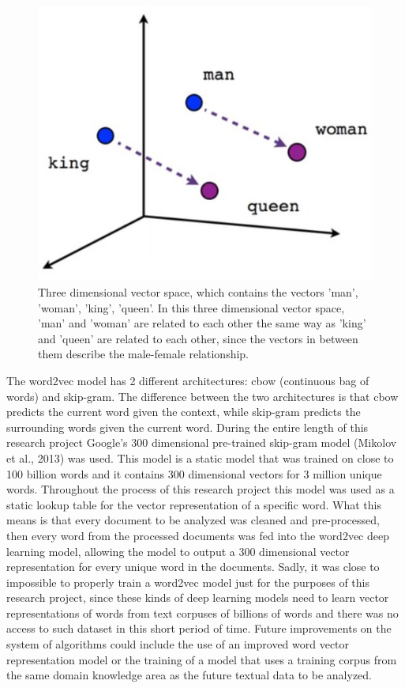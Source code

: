 \documentclass{sig-alternate}
\begin{document}
\begin{figure}
\centering
\includegraphics[scale=0.60]{images/vectorSpace.JPG}
\caption{Three dimensional vector space, which contains the vectors 'man', 'woman', 'king', 'queen'. In this three dimensional vector space,  'man' and 'woman' are related to each other the same way as 'king' and 'queen' are related to each other, since the vectors in between them describe the male-female relationship.}
\end{figure}

The word2vec model has 2 different architectures: cbow (continuous bag of words) and skip-gram. The difference between the two architectures is that cbow predicts the current word given the context, while skip-gram predicts the surrounding words given the current word. During the entire length of this research project Google's 300 dimensional pre-trained skip-gram model (Mikolov et al., 2013) was used. This model is a static model that was trained on close to 100 billion words and it contains 300 dimensional vectors for 3 million unique words. 
Throughout the process of this research project this model was used as a static lookup table for the vector representation of a specific word. What this means is that every document to be analyzed was cleaned and pre-processed, then every word from the processed documents was fed into the word2vec deep learning model, allowing the model to output a 300 dimensional vector representation for every unique word in the documents. Sadly, it was close to impossible to properly train a word2vec model just for the purposes of this research project, since these kinds of deep learning models need to learn vector representations of words from text corpuses of billions of words and there was no access to such dataset in this short period of time. Future improvements on the system of algorithms could include the use of an improved word vector representation model or the training of a model that uses a training corpus from the same domain knowledge area as the future textual data to be analyzed.
\end{document}

